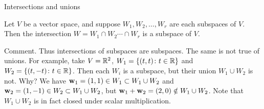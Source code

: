 \begin{frame}{Intersections and unions}
\begin{theorem}
Let $V$ be a vector space, and suppose $W_1,W_2,\dots, W_r$ are each subspaces of $V$. Then the intersection $W=W_1\cap W_2\cdots \cap W_r$ is a subspace of $V$. 
\end{theorem}
\pause
\alert{Comment}. Thus intersections of subspaces are subspaces. The same is not true of \alert{unions}. 
\bpause
For example, take $V={\mathbb R}^2$, $W_1=\{(t,t)\colon t\in{\mathbb R}\}$ and $W_2=\{(t,-t)\colon t\in{\mathbb R}\}$. Then each $W_i$ is a subspace, but their union $W_1\cup W_2$ is not. Why?
\bpause
We have ${\mathbf w}_1=(1,1)\in W_1\subset W_1\cup W_2$ and ${\mathbf w}_2=(1,-1)\in W_2\subset W_1\cup W_2$, but ${\mathbf w}_1+{\mathbf w}_2=(2,0)\notin W_1\cup W_2$.  
\bpause
Note that $W_1\cup W_2$ is in fact closed under scalar multiplication. 
\end{frame}
